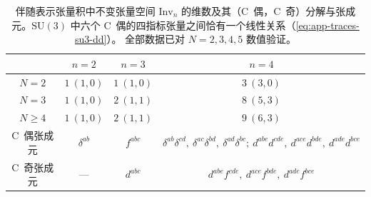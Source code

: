 \documentclass[UTF8,a4paper,11pt,fontset=fandol]{ctexart}
\theoremstyle{cplain}
\theoremstyle{cdefinition}
\theoremstyle{cremark}
\numberwithin{equation}{section}
\begin{document}
\begin{table}[htbp]
\centering
\caption{伴随表示张量积中不变张量空间 $\mathrm{Inv}_n$ 的维数及其（C~偶，C~奇）分解与张成元。$\mathrm{SU}(3)$ 中六个 C~偶的四指标张量之间恰有一个线性关系（\cref{eq:app-traces-su3-dd}）。
全部数据已对 $N=2,3,4,5$ 数值验证。}
\label{tab:color-inv}
\renewcommand{\arraystretch}{1.2}
\begin{tabular}{@{}cccc@{}}
\toprule
 & $n=2$ & $n=3$ & $n=4$\\
\midrule
$N=2$ & $1\ (1,0)$ & $1\ (1,0)$ & $3\ (3,0)$\\
$N=3$ & $1\ (1,0)$ & $2\ (1,1)$ & $8\ (5,3)$\\
$N\ge4$ & $1\ (1,0)$ & $2\ (1,1)$ & $9\ (6,3)$\\
\midrule
C~偶张成元 & $\delta^{ab}$ & $f^{abc}$ & $\delta^{ab}\delta^{cd},\ \delta^{ac}\delta^{bd},\ \delta^{ad}\delta^{bc};\ d^{abe}d^{cde},\ d^{ace}d^{bde},\ d^{ade}d^{bce}$\\
C~奇张成元 & --- & $d^{abc}$ & $d^{abe}f^{cde},\ d^{ace}f^{bde},\ d^{ade}f^{bce}$\\
\bottomrule
\end{tabular}
\end{table}
\end{document}
